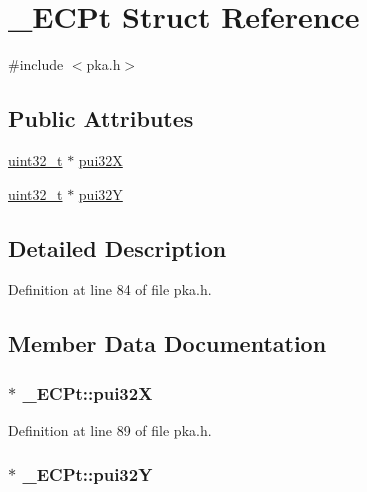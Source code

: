 \hypertarget{struct___e_c_pt}{}\section{\+\_\+\+E\+C\+Pt Struct Reference}
\label{struct___e_c_pt}


{\ttfamily \#include $<$pka.\+h$>$}

\subsection*{Public Attributes}
\begin{DoxyCompactItemize}
\item 
\hyperlink{_p_e___types_8h_a33594304e786b158f3fb30289278f5af}{uint32\+\_\+t} $\ast$ \hyperlink{struct___e_c_pt_ac3e07193d2fe8d1dfee1f0bf3ac8a576}{pui32X}
\item 
\hyperlink{_p_e___types_8h_a33594304e786b158f3fb30289278f5af}{uint32\+\_\+t} $\ast$ \hyperlink{struct___e_c_pt_afff1a3cc0910f16450ca200d85f10d0e}{pui32Y}
\end{DoxyCompactItemize}


\subsection{Detailed Description}


Definition at line 84 of file pka.\+h.



\subsection{Member Data Documentation}
\subsubsection[{\texorpdfstring{pui32X}{pui32X}}]{$\ast$ \+\_\+\+E\+C\+Pt\+::pui32X}\hypertarget{struct___e_c_pt_ac3e07193d2fe8d1dfee1f0bf3ac8a576}{}\label{struct___e_c_pt_ac3e07193d2fe8d1dfee1f0bf3ac8a576}


Definition at line 89 of file pka.\+h.

\subsubsection[{\texorpdfstring{pui32Y}{pui32Y}}]{$\ast$ \+\_\+\+E\+C\+Pt\+::pui32Y}\hypertarget{struct___e_c_pt_afff1a3cc0910f16450ca200d85f10d0e}{}\label{struct___e_c_pt_afff1a3cc0910f16450ca200d85f10d0e}


